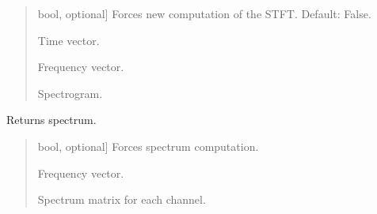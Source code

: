 \documentclass[letterpaper,10pt,english]{sphinxmanual}
\begin{document}
\begin{fulllineitems}
\begin{fulllineitems}
\begin{quote}
\begin{description}
\begin{description}
\sphinxlineitem{\sphinxstylestrong{force\_computation}}{[}bool, optional{]}
\sphinxAtStartPar
Forces new computation of the STFT. Default: False.

\end{description}

\begin{description}
\sphinxlineitem{\sphinxstylestrong{t\_s}}{[}\sphinxtitleref{np.ndarray}{]}
\sphinxAtStartPar
Time vector.

\sphinxlineitem{\sphinxstylestrong{f\_hz}}{[}\sphinxtitleref{np.ndarray}{]}
\sphinxAtStartPar
Frequency vector.

\sphinxlineitem{\sphinxstylestrong{spectrogram}}{[}\sphinxtitleref{np.ndarray}{]}
\sphinxAtStartPar
Spectrogram.

\end{description}

\end{description}\end{quote}

\end{fulllineitems}


\begin{fulllineitems}
\label{\detokenize{classes:dsptools.classes.signal_class.Signal.get_spectrum}}
\pysigstartsignatures
{}
\pysigstopsignatures
\sphinxAtStartPar
Returns spectrum.
\begin{quote}\begin{description}
\begin{description}
\sphinxlineitem{\sphinxstylestrong{force\_computation}}{[}bool, optional{]}
\sphinxAtStartPar
Forces spectrum computation.

\end{description}

\begin{description}
\sphinxlineitem{\sphinxstylestrong{spectrum\_freqs}}{[}\sphinxtitleref{np.ndarray}{]}
\sphinxAtStartPar
Frequency vector.

\sphinxlineitem{\sphinxstylestrong{spectrum}}{[}\sphinxtitleref{np.ndarray}{]}
\sphinxAtStartPar
Spectrum matrix for each channel.


\end{description}
\end{description}
\end{quote}
\end{fulllineitems}
\end{fulllineitems}
\end{document}
